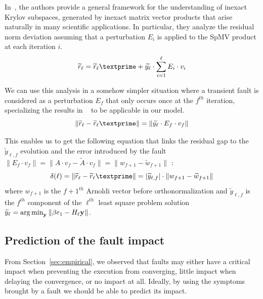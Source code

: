 
In~\cite{sisz:03}, the authors provide a general framework for the understanding of inexact Krylov subspaces, generated by inexact matrix vector products that arise naturally in many scientific applications. In particular, they analyze the residual norm deviation assuming that a perturbation $E_i$ is applied to the SpMV product at each
iteration $i$. 
\begin{equation}\label{inexact_krylov}
 \widetilde{r}_\ell = \widetilde{r}_\ell\textprime + \widetilde{y_\ell} \cdot \sum_{i=1}^{\ell}{E_i \cdot v_i}
 \end{equation}

We can use this analysis in a somehow simpler situation where a transient fault is considered as a perturbation $E_f$ that only occurs once at the $f^{th}$ iteration, specializing the results in ~\cite{sisz:03} to be applicable in our model.
\begin{equation}\label{inexact_krylov_adapted}
\| \widetilde{r}_\ell - \widetilde{r}_\ell\textprime \| =  \| \widetilde{y_\ell} \cdot E_f \cdot v_f \|
 \end{equation}

This enables us to get the following equation that links the residual gap to the $\widetilde{y}_{\ell, f}$ evolution and the error introduced by the fault $\|E_f \cdot v_f\| = \|A \cdot {v}_{f} - \widetilde{A} \cdot v_{f}\| = \|{w}_{f+1} - \widetilde{w}_{f+1}\|$ :
\begin{equation}\label{eqn:delta}
\delta(\ell) = \|\widetilde{r}_{\ell} - \widetilde{r}_{\ell}\textprime \| = |\widetilde{y}_{{\ell}, f}|\cdot \|{w}_{f+1} - \widetilde{w}_{f+1}\|
\end{equation}
where  $w_{f+1}$ is the $f+1^{th}$ Arnoldi vector before orthonormalization and $\widetilde{y}_{\ell, f}$ is the $f^{th}$ component of the $\ell^{th}$ least square problem solution $\widetilde{y}_\ell=\operatorname*{arg\,min}_{\mathbf{y_{}}}\|\beta e_1 - H_{\ell} \mathbf{y_{}}\|$.

\subsection{Prediction of the fault impact}\label{sec:prediction}
From Section~\ref{sec:empirical}, we observed that faults may either have a critical impact when preventing the execution from converging, little impact when delaying the convergence, or no impact at all. Ideally, by using the symptoms brought by a fault we should be able to predict its impact.


